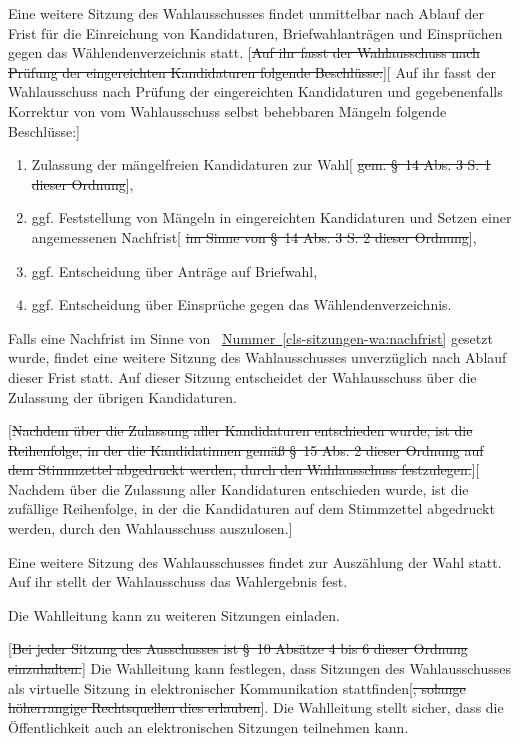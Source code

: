 \documentclass[%
draft,%
multilinesections%
]{fswo}
\newcommand\oldT[1]  {{\color{Gray}[\st{#1}]}}
\newcommand\newT[1]  {{\color{Green}[#1]}}
\newcommand\oldT[1]{}%
\newcommand\newT[1]{#1}
\newcommand\change[2]{\oldT{#1}\newT{#2}}
\newcommand*{\refItem}[1]{\hyperref[#1]{Nummer~\ref{#1}}}
\begin{document}
\begin{contract}
Eine weitere Sitzung des Wahlausschusses findet unmittelbar nach Ablauf der Frist für die Einreichung von Kandidaturen, Briefwahlanträgen und Einsprüchen gegen das Wählendenverzeichnis statt.
\change{Auf ihr fasst der Wahlausschuss nach Prüfung der eingereichten Kandidaturen folgende Beschlüsse:}{%
Auf ihr fasst der Wahlausschuss nach Prüfung der eingereichten Kandidaturen und gegebenenfalls Korrektur von vom Wahlausschuss selbst behebbaren Mängeln folgende Beschlüsse:}
\begin{enumerate}
\item Zulassung der mängelfreien Kandidaturen zur Wahl\oldT{ gem. \S~14 Abs. 3 S. 1 dieser Ordnung},
\item ggf. Feststellung von Mängeln in eingereichten Kandidaturen und Setzen einer angemessenen Nachfrist\label{cls-sitzungen-wa:nachfrist}\oldT{ im Sinne von \S~14 Abs. 3 S. 2 dieser Ordnung},
\item ggf. Entscheidung über Anträge auf Briefwahl,
\item ggf. Entscheidung über Einsprüche gegen das Wählendenverzeichnis.
\end{enumerate}
\label{cls-sitzungen-wa:abs-beschluesse-fristende}

Falls eine Nachfrist im Sinne von ~\refItem{cls-sitzungen-wa:nachfrist} gesetzt wurde, findet eine weitere Sitzung des Wahlausschusses unverzüglich nach Ablauf dieser Frist statt.
Auf dieser Sitzung entscheidet der Wahlausschuss über die Zulassung der übrigen Kandidaturen.
\label{cls-sitzungen-wa:abs-beschluesse-nachfristende}

\change{Nachdem über die Zulassung aller Kandidaturen entschieden wurde, ist die Reihenfolge, in der die Kandidatinnen gemäß \S~15 Abs. 2 dieser Ordnung auf dem Stimmzettel abgedruckt werden, durch den Wahlausschuss festzulegen.}{%
Nachdem über die Zulassung aller Kandidaturen entschieden wurde, ist die zufällige Reihenfolge, in der die Kandidaturen auf dem Stimmzettel abgedruckt werden, durch den Wahlausschuss auszulosen.}

Eine weitere Sitzung des Wahlausschusses findet zur Auszählung der Wahl statt. Auf ihr stellt der Wahlausschuss das Wahlergebnis fest.

Die Wahlleitung kann zu weiteren Sitzungen einladen.

\oldT{Bei jeder Sitzung des Ausschusses ist \S~10 Absätze 4 bis 6 dieser Ordnung einzuhalten.}
Die Wahlleitung kann festlegen, dass Sitzungen des Wahlausschusses als virtuelle Sitzung in elektronischer Kommunikation stattfinden\oldT{, solange höherrangige Rechtsquellen dies erlauben}.
Die Wahlleitung stellt sicher, dass die Öffentlichkeit auch an elektronischen Sitzungen teilnehmen kann.
\end{contract}
\end{document}
